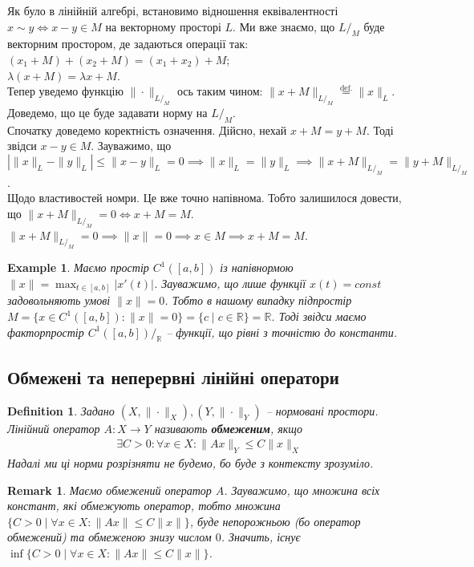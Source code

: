 \documentclass[a4paper, 10pt]{article}
\theoremstyle{theoremdd}
\theoremstyle{theoremdd}
\newtheorem{definition}[theorem]{Definition}
\theoremstyle{theoremdd}
\theoremstyle{theoremdd}
\newtheorem{example}[theorem]{Example}
\theoremstyle{theoremdd}
\theoremstyle{theoremdd}
\newtheorem{remark}[theorem]{Remark}
\theoremstyle{theoremdd}
\theoremstyle{theoremdd}
\begin{document}
\noindent
Як було в лінійній алгебрі, встановимо відношення еквівалентності $x \sim y \iff x - y \in M$ на векторному просторі $L$. Ми вже знаємо, що $L/_M$ буде векторним простором, де задаються операції так:\\
$(x_1+M) + (x_2+M) = (x_1+x_2) + M$;\\
$\lambda(x+M) = \lambda x + M$.\\
Тепер уведемо функцію $\| \cdot\|_{L/_M}$ ось таким чином: $\| x+M \|_{L/_M} \overset{\text{def.}}{=} \|x\|_L$. Доведемо, що це буде задавати норму на $L/_M$.\\
Спочатку доведемо коректність означення. Дійсно, нехай $x+M = y+M$. Тоді звідси $x-y \in M$. Зауважимо, що\\
$| \|x \|_L - \|y\|_L | \leq \|x - y \|_L = 0 \implies \|x\|_L = \|y\|_L \implies \|x+M\|_{L/_M} = \|y+M\|_{L/_M}$.\\
Щодо властивостей номри. Це вже точно напівнома. Тобто залишилося довести, що $\|x+M\|_{L/_M} = 0 \iff x+M = M$.\\
$\|x+M\|_{L/_M} = 0 \implies \|x\| = 0 \implies x \in M \implies x+M=M$.

\begin{example}
Маємо простір $C^1([a,b])$ із напівнормою $\|x\| = \displaystyle\max_{t \in [a,b]} |x'(t)|$. Зауважимо, що лише функції $x(t) = const$ задовольняють умові $\|x\| = 0$. Тобто в нашому випадку підпростір $M = \{x \in C^1([a,b]) : \|x\| = 0\} = \{c \mid c \in \mathbb{R}\} = \mathbb{R}$. Тоді звідси маємо факторпростір $C^1([a,b])/_{\mathbb{R}}$ -- функції, що рівні з точністю до константи. 
\end{example}

\subsection{Обмежені та неперервні лінійні оператори}
\begin{definition}
Задано $(X, \|\cdot \|_X),(Y, \| \cdot \|_Y)$ -- нормовані простори.\\
Лінійний оператор $A \colon X \to Y$ називають \textbf{обмеженим}, якщо
\begin{align*}
\exists C > 0: \forall x \in X: \| Ax \|_Y \leq C \| x \|_X
\end{align*}
Надалі ми ці норми розрізняти не будемо, бо буде з контексту зрозуміло.
\end{definition}

\begin{remark}
Маємо обмежений оператор $A$. Зауважимо, що множина всіх констант, які обмежують оператор, тобто множина $\{C > 0 \mid \forall x \in X: \| Ax\| \leq C \|x\|\}$, буде непорожньою (бо оператор обмежений) та обмеженою знизу числом $0$. Значить, існує $\displaystyle\inf\{C > 0 \mid \forall x \in X: \| Ax\| \leq C \|x\|\}$.
\end{remark}
\end{document}
